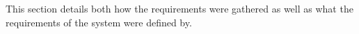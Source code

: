 This section details both how the requirements were gathered as well as what the requirements of the system were defined by.
